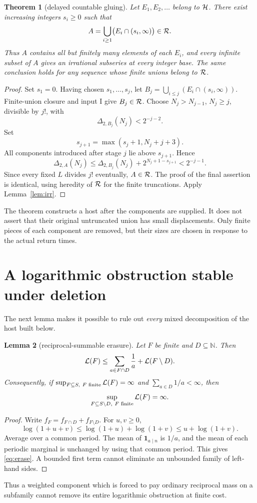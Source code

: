 \documentclass[11pt,a4paper]{article}
\newtheorem{theorem}{Theorem}[section]
\newtheorem{lemma}[theorem]{Lemma}
\theoremstyle{definition}\newtheorem{definition}[theorem]{Definition}
\theoremstyle{remark}\newtheorem{remark}[theorem]{Remark}
\newcommand{\N}{\mathbb N}\newcommand{\Z}{\mathbb Z}\newcommand{\Q}{\mathbb Q}\newcommand{\R}{\mathbb R}
\begin{document}
\begin{theorem}[delayed countable gluing]\label{thm:glue}
Let $E_1,E_2,\ldots$ belong to $\mathcal H$. There exist increasing integers $s_i\ge0$ such that
\[
 A=\bigcup_{i\ge1}\bigl(E_i\cap(s_i,\infty)\bigr)\in\mathcal R.
\]
Thus $A$ contains all but finitely many elements of each $E_i$, and every infinite subset of $A$ gives an irrational subseries at every integer base.
The same conclusion holds for any sequence whose finite unions belong to $\mathcal R$.
\end{theorem}
\begin{proof}
Set $s_1=0$. Having chosen $s_1,\ldots,s_j$, let
$B_j=\bigcup_{i\le j}(E_i\cap(s_i,\infty))$.
Finite-union closure and input I give $B_j\in\mathcal R$.
Choose $N_j>N_{j-1}$, $N_j\ge j$, divisible by $j!$, with
\[
 \Delta_{2,B_j}(N_j)<2^{-j-2}.
\]
Set
\[
 s_{j+1}=\max(s_j+1,N_j+j+3).
\]
All components introduced after stage $j$ lie above $s_{j+1}$. Hence
\[
 \Delta_{2,A}(N_j)
 \le\Delta_{2,B_j}(N_j)+2^{N_j+1-s_{j+1}}
 <2^{-j-1}.
\]
Since every fixed $L$ divides $j!$ eventually, $A\in\mathcal R$.
The proof of the final assertion is identical, using heredity of $\mathcal R$ for the finite truncations. Apply Lemma~\ref{lem:irr}.
\end{proof}

The theorem constructs a host after the components are supplied. It does not assert that their original untruncated union has small displacements. Only finite pieces of each component are removed, but their sizes are chosen in response to the actual return times.

\section{A logarithmic obstruction stable under deletion}
The next lemma makes it possible to rule out \emph{every} mixed decomposition of the host built below.
\begin{lemma}[reciprocal-summable erasure]\label{lem:erasure}
Let $F$ be finite and $D\subseteq\N$. Then
\begin{equation}\label{eq:erase}
 \mathcal L(F)\le\sum_{a\in F\cap D}\frac1a+\mathcal L(F\setminus D).
\end{equation}
Consequently, if $\sup_{F\subseteq S,\ F\text{ finite}}\mathcal L(F)=\infty$ and
$\sum_{a\in D}1/a<\infty$, then
\[
 \sup_{F\subseteq S\setminus D,\ F\text{ finite}}\LL(F)=\infty.
\]
\end{lemma}
\begin{proof}
Write $f_F=f_{F\cap D}+f_{F\setminus D}$. For $u,v\ge0$,
\[
 \log(1+u+v)\le\log(1+u)+\log(1+v)\le u+\log(1+v).
\]
Average over a common period. The mean of $\mathbf1_{a\mid n}$ is $1/a$, and the mean of each periodic marginal is unchanged by using that common period. This gives \eqref{eq:erase}. A bounded first term cannot eliminate an unbounded family of left-hand sides.
\end{proof}
Thus a weighted component which is forced to pay ordinary reciprocal mass on a subfamily cannot remove its entire logarithmic obstruction at finite cost.
\end{document}
